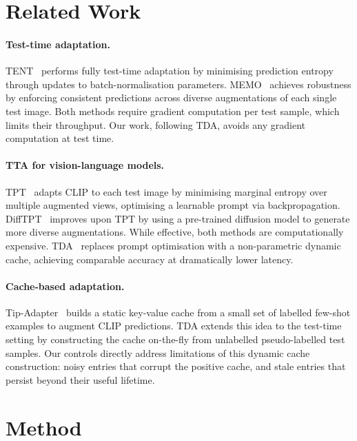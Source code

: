 \documentclass[10pt,twocolumn,letterpaper]{article}
\begin{document}
\section{Related Work}
\label{sec:related}

\paragraph{Test-time adaptation.}
TENT~\cite{wang2021tent} performs fully test-time adaptation by
minimising prediction entropy through updates to batch-normalisation
parameters.
MEMO~\cite{zhang2022memo} achieves robustness by enforcing consistent
predictions across diverse augmentations of each single test image.
Both methods require gradient computation per test sample, which
limits their throughput.
Our work, following TDA, avoids any gradient computation at test time.

\paragraph{TTA for vision-language models.}
TPT~\cite{shu2022tpt} adapts CLIP to each test image by minimising
marginal entropy over multiple augmented views, optimising a
learnable prompt via backpropagation.
DiffTPT~\cite{feng2023difftpt} improves upon TPT by using a
pre-trained diffusion model to generate more diverse augmentations.
While effective, both methods are computationally expensive.
TDA~\cite{karmanov2024tda} replaces prompt optimisation with a
non-parametric dynamic cache, achieving comparable accuracy at
dramatically lower latency.

\paragraph{Cache-based adaptation.}
Tip-Adapter~\cite{zhang2022tipadapter} builds a static key-value
cache from a small set of labelled few-shot examples to augment
CLIP predictions.
TDA extends this idea to the test-time setting by constructing the
cache on-the-fly from unlabelled pseudo-labelled test samples.
Our controls directly address limitations of this dynamic cache
construction: noisy entries that corrupt the positive cache, and
stale entries that persist beyond their useful lifetime.

\section{Method}
\label{sec:method}
\end{document}
